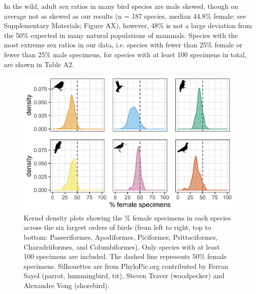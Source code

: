\documentclass[a4paper, 12pt]{article}
\begin{document}
In the wild, adult sex ratios in many bird species are male skewed, though on average not as skewed as our results (n = 187 species, median 44.8\% female\cite{szekely2014sex}; see Supplementary Materials; Figure AX), however, 48\% is not a large deviation from the 50\% expected in many natural populations of mammals\cite{karlin1986theoretical}.
Species with the most extreme sex ratios in our data, i.e. species with fewer than 25\% female or fewer than 25\% male specimens, for species with at least 100 specimens in total, are shown in Table A2. 

\begin{figure}
 \centering
  \includegraphics[width = \linewidth]{figures/orders-density-birds-six.png}
  \caption{Kernel density plots showing the \% female specimens in each species across the six largest orders of birds (from left to right, top to bottom: Passeriformes, Apodiformes, Piciformes, Psittaciformes, Charadriiformes, and Columbiformes). 
  Only species with at least 100 specimens are included. 
  The dashed line represents 50\% female specimens. 
  Silhouettes are from PhyloPic.org contributed by Ferran Sayol (parrot, hummingbird, tit), Steven Traver (woodpecker) and Alexandre Vong (shorebird).}
  \label{fig-bird_order_six}
\end{figure}
\end{document}
